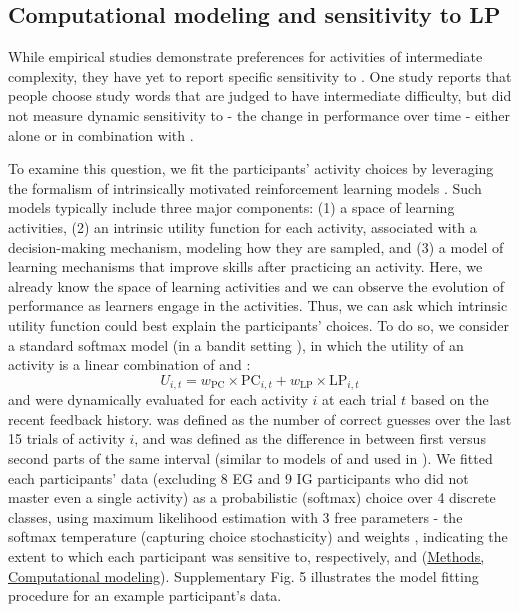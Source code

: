     \subsection{Computational modeling and sensitivity to LP}\label{subsec:results/modeling}
    While empirical studies demonstrate preferences for activities of intermediate complexity, they have yet to report specific sensitivity to {\LP}. One study \cite{son2000metacognitive} reports that people choose study words that are judged to have intermediate difficulty, but did not measure dynamic sensitivity to {\LP} - the change in performance over time - either alone or in combination with {\PC}.
    
    To examine this question, we fit the participants' activity choices by leveraging the formalism of intrinsically motivated reinforcement learning models \cite{lopes2012strategic,graves2017automated,linke2020adapting,colas2019curious}. Such models typically include three major components: (1) a space of learning activities, (2) an intrinsic utility function for each activity, associated with a decision-making mechanism, modeling how they are sampled, and (3) a model of learning mechanisms that improve skills after practicing an activity. Here, we already know the space of learning activities and we can observe the evolution of performance as learners engage in the activities. Thus, we can ask which intrinsic utility function could best explain the participants' choices. To do so, we consider a standard softmax model (in a bandit setting \cite{linke2020adapting}), in which the utility of an activity is a linear combination of {\PC} and {\LP}:
    \begin{equation}
        U_{i,t} = w_{\mathrm{PC}} \times \mathrm{PC}_{i,t} +  w_{\mathrm{LP}} \times \mathrm{LP}_{i,t}
        \label{eq:utility}
    \end{equation}
    {\PC} and {\LP} were dynamically evaluated for each activity $i$ at each trial $t$ based on the recent feedback history. {\PC} was defined as the number of correct guesses over the last 15 trials of activity $i$, and {\LP} was defined as the difference in {\PC} between first versus second parts of the same interval (similar to models of {\PC} and {\LP} used in \cite{oudeyer2007intrinsic,colas2019curious,linke2020adapting}). We fitted each participants’ data (excluding 8 EG and 9 IG participants who did not master even a single activity) as a probabilistic (softmax) choice over 4 discrete classes, using maximum likelihood estimation with 3 free parameters - the softmax temperature (capturing choice stochasticity) and weights {\wPC}, {\wLP} indicating the extent to which each participant was sensitive to, respectively, {\PC} and {\LP} (\hyperref[subsubsec:methods/analysis/modeling]{Methods, Computational modeling}). Supplementary Fig. 5 illustrates the model fitting procedure for an example participant's data.
    

